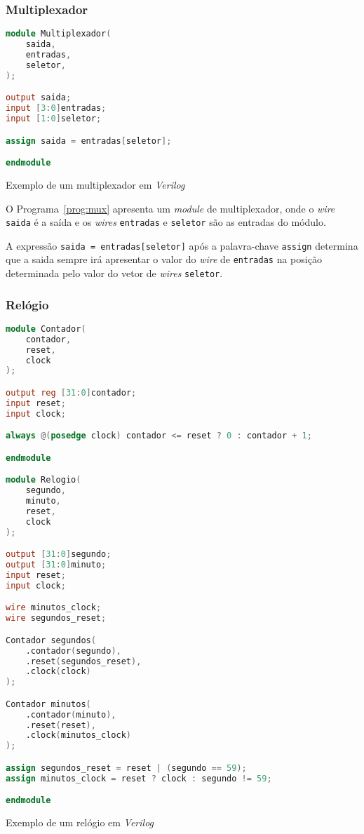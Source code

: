\subsubsection{Multiplexador}
\label{ssec:mux}

\begin{program}
  \centering

\begin{lstlisting}[language=Verilog, style=wider]
module Multiplexador(
    saida,
    entradas,
    seletor,
);

output saida;
input [3:0]entradas;
input [1:0]seletor;

assign saida = entradas[seletor];

endmodule
\end{lstlisting}

  \caption{Exemplo de um multiplexador em \emph{Verilog}\label{prog:mux}}
\end{program}

O Programa~\ref{prog:mux} apresenta um \emph{module} de multiplexador,
onde o \emph{wire} \texttt{saida} é a saída e os \emph{wires}
\texttt{entradas} e \texttt{seletor} são as entradas do módulo.

A expressão \texttt{saida = entradas[seletor]} após a palavra-chave
\texttt{assign} determina que a saida sempre irá apresentar o valor do
\emph{wire} de \texttt{entradas} na posição determinada pelo valor 
do vetor de \emph{wires} \texttt{seletor}.

\subsubsection{Relógio}
\label{ssec:clock}

\begin{program}
  \centering

\begin{lstlisting}[language=Verilog, style=wider]
module Contador(
    contador,
    reset,
    clock
);

output reg [31:0]contador;
input reset;
input clock;

always @(posedge clock) contador <= reset ? 0 : contador + 1;

endmodule

module Relogio(
    segundo,
    minuto,
    reset,
    clock
);

output [31:0]segundo;
output [31:0]minuto;
input reset;
input clock;

wire minutos_clock;
wire segundos_reset;

Contador segundos(
    .contador(segundo),
    .reset(segundos_reset),
    .clock(clock)
);

Contador minutos(
    .contador(minuto),
    .reset(reset),
    .clock(minutos_clock)
);

assign segundos_reset = reset | (segundo == 59);
assign minutos_clock = reset ? clock : segundo != 59;

endmodule
\end{lstlisting}

  \caption{Exemplo de um relógio em \emph{Verilog}\label{prog:clock}}
\end{program}

